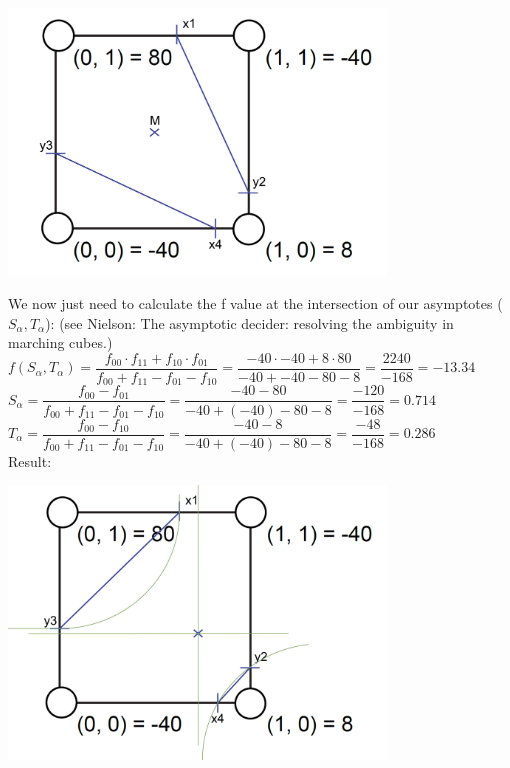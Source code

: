 \documentclass[a4paper]{article}
\begin{document}
\begin{center}
	\includegraphics[width=10cm]{8T1_M.png}
\end{center}
We now just need to calculate the f value at the intersection of our asymptotes ($S_{\alpha}, T_{\alpha}$): (see Nielson: The asymptotic decider: resolving the ambiguity in marching cubes.)\\  \linebreak
$f(S_{\alpha}, T_{\alpha})  = \dfrac{f_{00} \cdot f_{11} + f_{10} \cdot f_{01}}{f_{00} + f_{11} - f_{01} - f_{10}} = \dfrac{-40 \cdot -40 + 8 \cdot 80}{-40 + -40 - 80 - 8} = \dfrac{2240}{-168} = -13.34$ \\ \linebreak
$S_{\alpha} = \dfrac{f_{00}-f_{01}}{f_{00} + f_{11} - f_{01} - f_{10}} =\dfrac{-40 - 80}{-40 + (-40) - 80 -8} = \dfrac{-120}{-168} = 0.714$\\ \linebreak
$T_{\alpha} = \dfrac{f_{00}-f_{10}}{f_{00} + f_{11} - f_{01} - f_{10}} = \dfrac{-40 - 8}{-40 + (-40) - 80 -8} = \dfrac{-48}{-168} = 0.286$\\ \linebreak
Result: \\
\begin{center}
	\includegraphics[width=10cm]{8T1_A.png}
	
\end{center}
\end{document}
